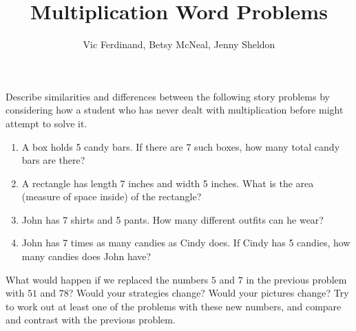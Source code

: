\documentclass[nooutcomes]{ximera}
\title{Multiplication Word Problems}
\author{Vic Ferdinand, Betsy McNeal, Jenny Sheldon}
\begin{document}
\begin{abstract} \end{abstract}
\maketitle


\begin{problem}
Describe similarities and differences between the following story problems by considering how a student who has never dealt with multiplication before might attempt to solve it.
\begin{enumerate}
\item A box holds 5 candy bars.  If there are 7 such boxes, how many total candy bars are there?

\vfill

\item A rectangle has length 7 inches and width 5 inches.  What is the area (measure of space inside) of the rectangle?


\vfill


\item John has 7 shirts and 5 pants.  How many different outfits can he wear?


\vfill

\item John has 7 times as many candies as Cindy does.  If Cindy has 5 candies, how many candies does John have?

\vfill

\end{enumerate}
\end{problem}

\begin{problem}
What would happen if we replaced the numbers $5$ and $7$ in the previous problem with $51$ and $78$?  Would your strategies change?  Would your pictures change?  Try to work out at least one of the problems with these new numbers, and compare and contrast with the previous problem.
\end{problem}
\end{document}
